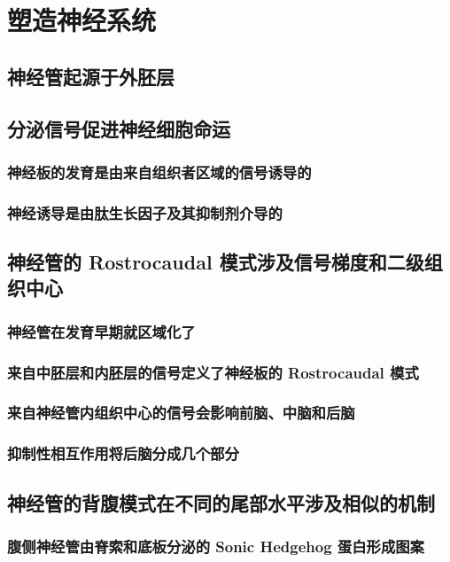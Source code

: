 \chapter{塑造神经系统}

\section{神经管起源于外胚层}

\section{分泌信号促进神经细胞命运}
\subsection{神经板的发育是由来自组织者区域的信号诱导的}
\subsection{神经诱导是由肽生长因子及其抑制剂介导的}

\section{神经管的 Rostrocaudal 模式涉及信号梯度和二级组织中心}
\subsection{神经管在发育早期就区域化了}
\subsection{来自中胚层和内胚层的信号定义了神经板的 Rostrocaudal 模式}
\subsection{来自神经管内组织中心的信号会影响前脑、中脑和后脑}
\subsection{抑制性相互作用将后脑分成几个部分}

\section{神经管的背腹模式在不同的尾部水平涉及相似的机制}
\subsection{腹侧神经管由脊索和底板分泌的 Sonic Hedgehog 蛋白形成图案}
